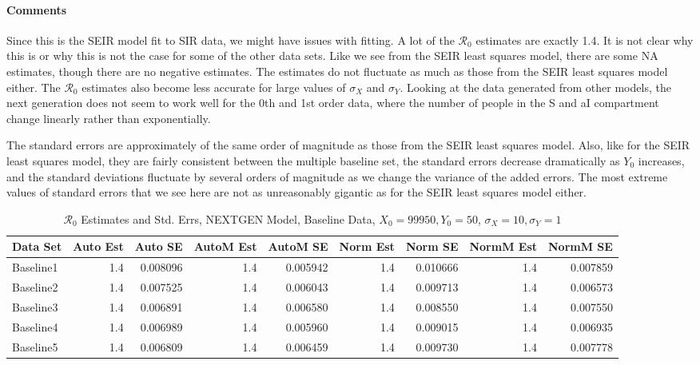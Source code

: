 \documentclass[12pt]{article}
\newcommand{\rr}{\ensuremath{\mathcal{R}_0}}
\begin{document}
\paragraph{Comments}

Since this is the SEIR model fit to SIR data, we might have issues with fitting. A lot of the $\rr$ estimates are exactly 1.4. It is not clear why this is or why this is not the case for some of the other data sets. Like we see from the SEIR least squares model, there are some NA estimates, though there are no negative estimates. The estimates do not fluctuate as much as those from the SEIR least squares model either. The $\rr$ estimates also become less accurate for large values of $\sigma_X$ and $\sigma_Y$. Looking at the data generated from other models, the next generation does not seem to work well for the 0th and 1st order data, where the number of people in the S and aI compartment change linearly rather than exponentially.

The standard errors are approximately of the same order of magnitude as those from the SEIR least squares model. Also, like for the SEIR least squares model, they are fairly consistent between the multiple baseline set, the standard errors decrease dramatically as $Y_0$ increases, and the standard deviations fluctuate by several orders of magnitude as we change the variance of the added errors. The most extreme values of standard errors that we see here are not as unreasonably gigantic as for the SEIR least squares model either.

\begin{table}[H]
	
	\caption{$\rr$ Estimates and Std. Errs, NEXTGEN Model, 
		Baseline Data, $X_0 = 99950, Y_0 = 50$, 
		$\sigma_X = 10, \sigma_Y = 1$}
	\begin{footnotesize}
		\hskip -1cm
		\begin{tabular}{l|r|r|r|r|r|r|r|r}
			\hline
			Data Set & Auto Est & Auto SE & AutoM Est & AutoM SE & Norm Est & Norm SE & NormM Est & NormM SE\\
			\hline
			Baseline1 & 1.4 & 0.008096 & 1.4 & 0.005942 & 1.4 & 0.010666 & 1.4 & 0.007859\\
			\hline
			Baseline2 & 1.4 & 0.007525 & 1.4 & 0.006043 & 1.4 & 0.009713 & 1.4 & 0.006573\\
			\hline
			Baseline3 & 1.4 & 0.006891 & 1.4 & 0.006580 & 1.4 & 0.008550 & 1.4 & 0.007550\\
			\hline
			Baseline4 & 1.4 & 0.006989 & 1.4 & 0.005960 & 1.4 & 0.009015 & 1.4 & 0.006935\\
			\hline
			Baseline5 & 1.4 & 0.006809 & 1.4 & 0.006459 & 1.4 & 0.009730 & 1.4 & 0.007778\\
			\hline
		\end{tabular}
	\end{footnotesize}
\end{table}
\end{document}
